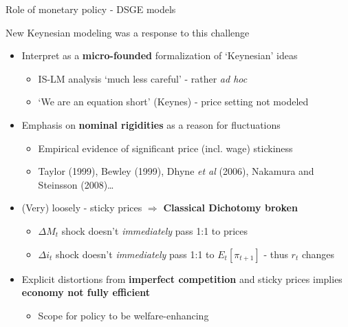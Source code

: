 

\begin{frame}{Role of monetary policy - DSGE models}

New Keynesian modeling was a response to this challenge
\vspace{2mm}
\begin{itemize}
\item	Interpret as a \textbf{micro-founded} formalization of `Keynesian' ideas
	\begin{itemize}
	\item	IS-LM analysis `much less careful' - rather \emph{ad hoc}
	\item	`We are an equation short' (Keynes) - price setting not modeled
	\end{itemize}
\vspace{1mm}
\item	Emphasis on \textbf{nominal rigidities} as a reason for fluctuations
	\begin{itemize}
	\item	Empirical evidence of significant price (incl. wage) stickiness
	\item	Taylor (1999), Bewley (1999), Dhyne \emph{et al} (2006), Nakamura and Steinsson (2008)\ldots
	\end{itemize}
\vspace{1mm}	
\item	(Very) loosely - sticky prices $\Rightarrow$ \textbf{Classical Dichotomy broken}
	\begin{itemize}
	\item	$\Delta M_{t}$ shock doesn't \emph{immediately} pass 1:1 to prices
	\item	$\Delta i_{t}$ shock doesn't \emph{immediately} pass 1:1 to $E_{t}[\pi_{t+1}]$ - thus $r_{t}$ changes
	\end{itemize}
\vspace{1mm}	
\item	Explicit distortions from \textbf{imperfect competition} and sticky prices implies \textbf{economy not fully efficient}
	\begin{itemize}
	\item	Scope for policy to be welfare-enhancing
	\end{itemize}
\end{itemize}

\end{frame}


